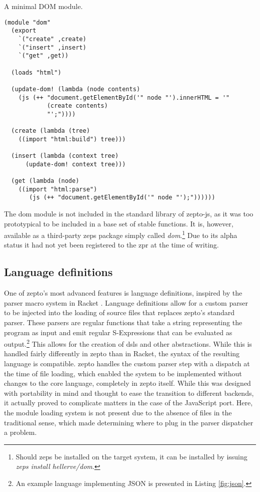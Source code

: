 \documentclass[oneside,11pt,xetex]{scrbook}
\begin{document}
\begin{listing}[H]
\caption{A minimal DOM module.}
\begin{verbatim}
(module "dom"
  (export
    `("create" ,create)
    `("insert" ,insert)
    `("get" ,get))

  (loads "html")

  (update-dom! (lambda (node contents)
    (js (++ "document.getElementById('" node "').innerHTML = '"
            (create contents)
            "';"))))

  (create (lambda (tree)
    ((import "html:build") tree)))

  (insert (lambda (context tree)
      (update-dom! context tree)))

  (get (lambda (node)
    ((import "html:parse")
       (js (++ "document.getElementById('" node "');"))))))
\end{verbatim}
\label{fig:dom}
\end{listing}

The \gls{dom} module is not included in the standard library of zepto-js,
as it was too prototypical to be included in a base set of stable
functions. It is, however, available as a third-party \gls{zeps} package
simply called \textit{dom}.\footnote{Should \gls{zeps} be installed on
the target system, it can be installed by issuing \textit{zeps install
hellerve/dom}.} Due to its alpha status it had not yet been registered
to the \gls{zpr} at the time of writing.

\subsection{Language definitions}

One of zepto's most advanced features is language definitions, inspired by
the parser macro system in Racket \parencite{RPM}. Language definitions allow
for a custom parser to be injected into the loading of source files that replaces
zepto's standard parser. These parsers are regular functions that take a string
representing the program as input and emit regular S-Expressions that can be evaluated
as output.\footnote{An example language implementing JSON is presented in Listing \ref{fig:json}.}
This allows for the creation of \glspl{dsl} and other abstractions.
While this is handled fairly differently in zepto than in Racket, the syntax of the
resulting language is compatible. zepto handles the custom parser step with a dispatch
at the time of file loading, which enabled the system to be implemented without
changes to the core language, completely in zepto itself. While this was
designed with portability in mind and thought to ease the transition to
different backends, it actually proved to complicate matters in the case
of the JavaScript port. Here, the module loading system is not present due
to the absence of files in the traditional sense, which made determining where to
plug in the parser dispatcher a problem.
\end{document}
